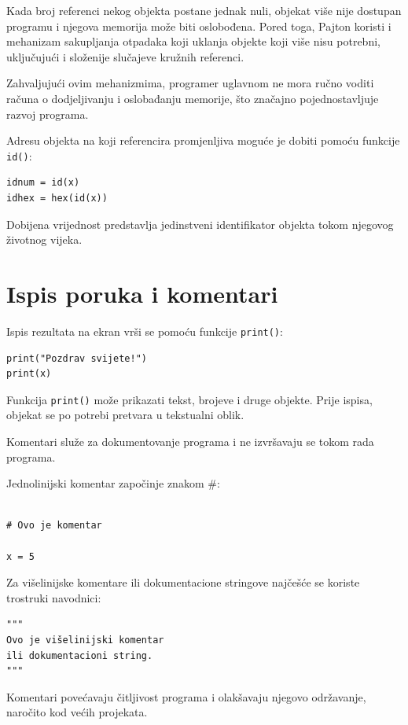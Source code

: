  Kada broj referenci nekog objekta postane jednak nuli, objekat više nije dostupan programu i njegova memorija može biti oslobođena. Pored toga, Pajton koristi i mehanizam sakupljanja otpadaka koji uklanja objekte koji više nisu potrebni, uključujući i složenije slučajeve kružnih referenci.
 
 Zahvaljujući ovim mehanizmima, programer uglavnom ne mora ručno voditi računa o dodjeljivanju i oslobađanju memorije, što značajno pojednostavljuje razvoj programa.
 
 Adresu objekta na koji referencira promjenljiva moguće je dobiti pomoću funkcije \texttt{id()}:
 
 \begin{verbatim}
idnum = id(x)
idhex = hex(id(x))
\end{verbatim}
 
 Dobijena vrijednost predstavlja jedinstveni identifikator objekta tokom njegovog životnog vijeka.
 
\section{Ispis poruka i komentari}
 
 Ispis rezultata na ekran vrši se pomoću funkcije \texttt{print()}:
 
 \begin{verbatim}
print("Pozdrav svijete!")
print(x)
\end{verbatim}
 
 Funkcija \texttt{print()} može prikazati tekst, brojeve i druge objekte. Prije ispisa, objekat se po potrebi pretvara u tekstualni oblik.
 
 Komentari služe za dokumentovanje programa i ne izvršavaju se tokom rada programa.
 
 Jednolinijski komentar započinje znakom {\#}:
 
 \begin{verbatim}
 	
# Ovo je komentar

x = 5
\end{verbatim}
 
 Za višelinijske komentare ili dokumentacione stringove najčešće se koriste trostruki navodnici:
 
 \begin{verbatim}
"""
Ovo je višelinijski komentar
ili dokumentacioni string.
"""
\end{verbatim}
 
 Komentari povećavaju čitljivost programa i olakšavaju njegovo održavanje, naročito kod većih projekata.
 

